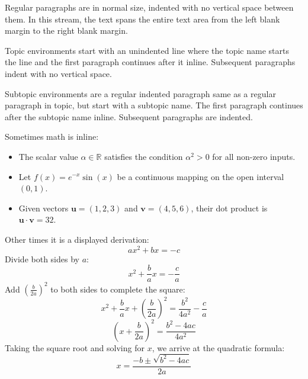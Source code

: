 \documentclass[paper=a4, fontsize=9]{habshe-tufte}
\begin{document}

\subject{Part I: Full-Width Stream}





Regular paragraphs are in normal size, indented with no vertical space between them. In this stream, the text spans the entire text area from the left blank margin to the right blank margin.

\lipsum[4]

\begin{topic}
  Topic environments start with an unindented line where the topic name starts the line and the first paragraph continues after it inline. Subsequent paragraphs indent with no vertical space.

  \lipsum[7]

  \begin{subtopic}
    Subtopic environments are a regular indented paragraph same as a regular paragraph in topic, but start with a subtopic name. The first paragraph continues after the subtopic name inline. Subsequent paragraphs are indented.

    \lipsum[9]
  \end{subtopic}

  \lipsum[11]
\end{topic}

Sometimes math is inline:
\begin{itemize}
\item The scalar value $\alpha \in \mathbb{R}$ satisfies the condition $\alpha^2 > 0$ for all non-zero inputs.
\item Let $f(x) = e^{-x} \sin(x)$ be a continuous mapping on the open interval $(0, 1)$.
\item Given vectors $\mathbf{u} = (1, 2, 3)$ and $\mathbf{v} = (4, 5, 6)$, their dot product is $\mathbf{u} \cdot \mathbf{v} = 32$.
\end{itemize}

Other times it is a displayed derivation:
$$
ax^2 + bx = -c
$$
Divide both sides by $a$:
$$
x^2 + \frac{b}{a}x = -\frac{c}{a}
$$
Add $\left(\frac{b}{2a}\right)^2$ to both sides to complete the square:
$$
x^2 + \frac{b}{a}x + \left(\frac{b}{2a}\right)^2 = \frac{b^2}{4a^2} - \frac{c}{a}
$$
$$
\left(x + \frac{b}{2a}\right)^2 = \frac{b^2 - 4ac}{4a^2}
$$
Taking the square root and solving for $x$, we arrive at the quadratic formula:
$$
x = \frac{-b \pm \sqrt{b^2 - 4ac}}{2a}
$$
\end{document}
